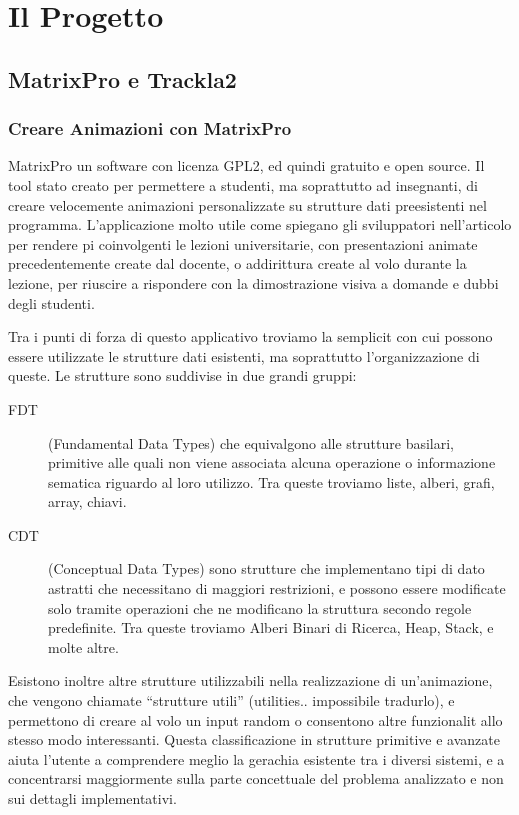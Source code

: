 
\chapter{Il Progetto}


\section{\label{sec:MatrixPro-e-Trackla2}MatrixPro e Trackla2}


\subsection{Creare Animazioni con MatrixPro}

MatrixPro \cite{MatrixPro} un software con licenza GPL2, ed quindi
gratuito e open source. Il tool  stato creato per permettere a studenti,
ma soprattutto ad insegnanti, di creare velocemente animazioni personalizzate
su strutture dati preesistenti nel programma. L'applicazione molto
utile come spiegano gli sviluppatori nell'articolo \cite{MatrixPro}
per rendere pi coinvolgenti le lezioni universitarie, con presentazioni
animate precedentemente create dal docente, o addirittura create al
volo durante la lezione, per riuscire a rispondere con la dimostrazione
visiva a domande e dubbi degli studenti.

Tra i punti di forza di questo applicativo troviamo la semplicit
con cui possono essere utilizzate le strutture dati esistenti, ma
soprattutto l'organizzazione di queste. Le strutture sono suddivise
in due grandi gruppi: 
\begin{description}
\item [{{FDT}}] (Fundamental Data Types) che equivalgono alle strutture
basilari, primitive alle quali non viene associata alcuna operazione
o informazione sematica riguardo al loro utilizzo. Tra queste troviamo
liste, alberi, grafi, array, chiavi. 
\item [{{CDT}}] (Conceptual Data Types) sono strutture che implementano
tipi di dato astratti che necessitano di maggiori restrizioni, e possono
essere modificate solo tramite operazioni che ne modificano la struttura
secondo regole predefinite. Tra queste troviamo Alberi Binari di Ricerca,
Heap, Stack, e molte altre. 
\end{description}
Esistono inoltre altre strutture utilizzabili nella realizzazione
di un'animazione, che vengono chiamate {}``strutture utili'' (utilities..
impossibile tradurlo), e permettono di creare al volo un input random
o consentono altre funzionalit allo stesso modo interessanti. Questa
classificazione in strutture primitive e avanzate aiuta l'utente a
comprendere meglio la gerachia esistente tra i diversi sistemi, e
a concentrarsi maggiormente sulla parte concettuale del problema analizzato
e non sui dettagli implementativi.


